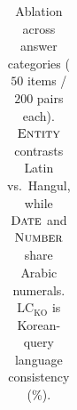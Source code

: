 \begin{table}[t]
\begin{minipage}[t]{0.485\textwidth}
{\begin{tabular}{@{}llccccc@{}}
\bottomrule
\end{tabular}%
}
\caption{Ablation by closed-book parametric prior knowledge strata ($N{=}150$ items). $\text{TOR}$ is the $\text{Pair}_2$ Truth Override Rate (\%).}
\label{tab:ablation_prior}
\end{minipage}%
\hfill
\begin{minipage}[t]{0.485\textwidth}
\centering
{}
\caption{Ablation across answer categories ($50$ items / $200$ pairs each). $\textsc{Entity}$ contrasts Latin vs.\ Hangul, while $\textsc{Date}$ and $\textsc{Number}$ share Arabic numerals. $\text{LC}_{\text{KO}}$ is Korean-query language consistency (\%).}
\label{tab:ablation_category}
\end{minipage}
\end{table}

